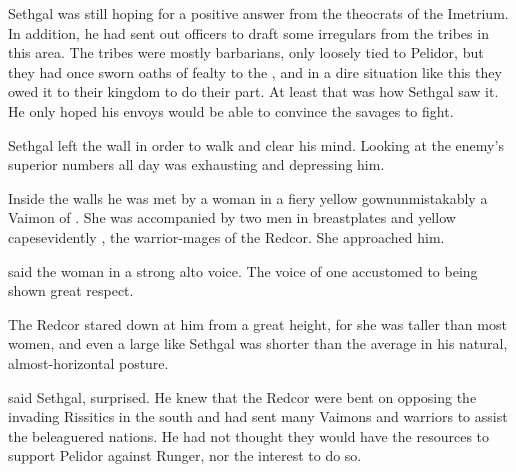 
Sethgal was still hoping for a positive answer from the theocrats of the Imetrium.
In addition, he had sent out officers to draft some irregulars from the tribes in this area. 
The tribes were mostly barbarians, only loosely tied to Pelidor, but they had once sworn oaths of fealty to the \rayuth, and in a dire situation like this they owed it to their kingdom to do their part. 
At least that was how Sethgal saw it.
He only hoped his envoys would be able to convince the savages to fight.





\begin{comment}
  \section{Sethgal and \Esmerel}
\end{comment}
\new
Sethgal left the wall in order to walk and clear his mind. 
Looking at the enemy's superior numbers all day was exhausting and depressing him. 

Inside the walls he was met by a \human woman in a fiery yellow gown\dash unmistakably a Vaimon \cleric of \ClanRedcor. 
She was accompanied by two men in breastplates and yellow capes\dash evidently \gandierres, the \templar warrior-mages of the Redcor. 
She approached him. 

 said the woman in a strong alto voice. 
The voice of one accustomed to being shown great respect. 


The Redcor stared down at him from a great height, for she was taller than most women, and even a large \scatha like Sethgal was shorter than the average \human in his natural, almost-horizontal posture. 


 said Sethgal, surprised.
He knew that the Redcor were bent on opposing the invading Rissitics in the south and had sent many Vaimons and warriors to assist the beleaguered nations. 
He had not thought they would have the resources to support Pelidor against Runger, nor the interest to do so. 

